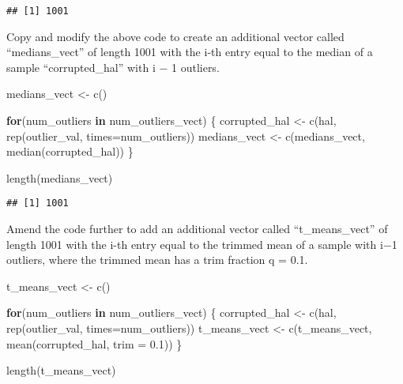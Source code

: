\documentclass[
]{article}
\newenvironment{Shaded}{\begin{snugshade}}{\end{snugshade}}
\newcommand{\AttributeTok}[1]{\textcolor[rgb]{0.77,0.63,0.00}{#1}}
\newcommand{\ControlFlowTok}[1]{\textcolor[rgb]{0.13,0.29,0.53}{\textbf{#1}}}
\newcommand{\FloatTok}[1]{\textcolor[rgb]{0.00,0.00,0.81}{#1}}
\newcommand{\FunctionTok}[1]{\textcolor[rgb]{0.00,0.00,0.00}{#1}}
\newcommand{\NormalTok}[1]{#1}
\newcommand{\OtherTok}[1]{\textcolor[rgb]{0.56,0.35,0.01}{#1}}
\begin{document}
\begin{verbatim}
## [1] 1001
\end{verbatim}

Copy and modify the above code to create an additional vector called
``medians\_vect'' of length 1001 with the i-th entry equal to the median
of a sample ``corrupted\_hal'' with i − 1 outliers.

\begin{Shaded}
\begin{Highlighting}[]
\NormalTok{medians\_vect }\OtherTok{\textless{}{-}} \FunctionTok{c}\NormalTok{()}

\ControlFlowTok{for}\NormalTok{(num\_outliers }\ControlFlowTok{in}\NormalTok{ num\_outliers\_vect) \{}
\NormalTok{  corrupted\_hal }\OtherTok{\textless{}{-}} \FunctionTok{c}\NormalTok{(hal, }\FunctionTok{rep}\NormalTok{(outlier\_val, }\AttributeTok{times=}\NormalTok{num\_outliers))}
\NormalTok{  medians\_vect }\OtherTok{\textless{}{-}} \FunctionTok{c}\NormalTok{(medians\_vect, }\FunctionTok{median}\NormalTok{(corrupted\_hal))}
\NormalTok{\}}

\FunctionTok{length}\NormalTok{(medians\_vect)}
\end{Highlighting}
\end{Shaded}

\begin{verbatim}
## [1] 1001
\end{verbatim}

Amend the code further to add an additional vector called
``t\_means\_vect'' of length 1001 with the i-th entry equal to the
trimmed mean of a sample with i−1 outliers, where the trimmed mean has a
trim fraction q = 0.1.

\begin{Shaded}
\begin{Highlighting}[]
\NormalTok{t\_means\_vect }\OtherTok{\textless{}{-}} \FunctionTok{c}\NormalTok{()}

\ControlFlowTok{for}\NormalTok{(num\_outliers }\ControlFlowTok{in}\NormalTok{ num\_outliers\_vect) \{}
\NormalTok{  corrupted\_hal }\OtherTok{\textless{}{-}} \FunctionTok{c}\NormalTok{(hal, }\FunctionTok{rep}\NormalTok{(outlier\_val, }\AttributeTok{times=}\NormalTok{num\_outliers))}
\NormalTok{  t\_means\_vect }\OtherTok{\textless{}{-}} \FunctionTok{c}\NormalTok{(t\_means\_vect, }\FunctionTok{mean}\NormalTok{(corrupted\_hal, }\AttributeTok{trim =} \FloatTok{0.1}\NormalTok{))}
\NormalTok{\}}

\FunctionTok{length}\NormalTok{(t\_means\_vect)}
\end{Highlighting}
\end{Shaded}
\end{document}
